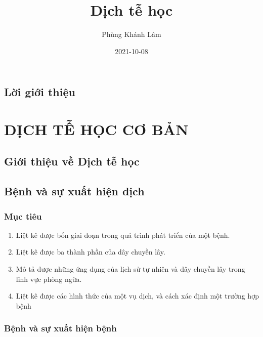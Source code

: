 \documentclass[
]{book}
\title{Dịch tễ học}
\author{Phùng Khánh Lâm}
\date{2021-10-08}
\providecommand{\tightlist}{%
  \setlength{\itemsep}{0pt}\setlength{\parskip}{0pt}}
\begin{document}
\maketitle

{
\setcounter{tocdepth}{1}
\tableofcontents
}
\hypertarget{lux1eddi-giux1edbi-thiux1ec7u}{%
\chapter*{Lời giới thiệu}\label{lux1eddi-giux1edbi-thiux1ec7u}}

\hypertarget{part-dux1ecbch-tux1ec5-hux1ecdc-cux1a1-bux1ea3n}{%
\part{DỊCH TỄ HỌC CƠ BẢN}\label{part-dux1ecbch-tux1ec5-hux1ecdc-cux1a1-bux1ea3n}}

\hypertarget{dthcb_gioithieu}{%
\chapter{Giới thiệu về Dịch tễ học}\label{dthcb_gioithieu}}

\hypertarget{dthcb_dich}{%
\chapter{Bệnh và sự xuất hiện dịch}\label{dthcb_dich}}

\hypertarget{mux1ee5c-tiuxeau}{%
\section{Mục tiêu}\label{mux1ee5c-tiuxeau}}

\begin{enumerate}
\def\labelenumi{\arabic{enumi}.}
\tightlist
\item
  Liệt kê được bốn giai đoạn trong quá trình phát triển của một bệnh.
\item
  Liệt kê được ba thành phần của dây chuyền lây.
\item
  Mô tả được những ứng dụng của lịch sử tự nhiên và dây chuyền lây trong lĩnh vực phòng ngừa.
\item
  Liệt kê được các hình thức của một vụ dịch, và cách xác định một trường hợp bệnh
\end{enumerate}

\hypertarget{bux1ec7nh-vuxe0-sux1ef1-xuux1ea5t-hiux1ec7n-bux1ec7nh}{%
\section{Bệnh và sự xuất hiện bệnh}\label{bux1ec7nh-vuxe0-sux1ef1-xuux1ea5t-hiux1ec7n-bux1ec7nh}}
\end{document}
